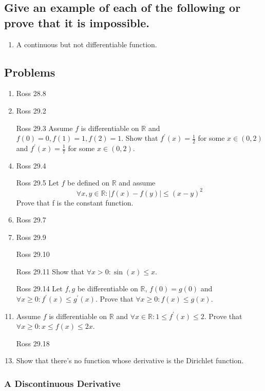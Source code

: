 \documentclass{article}
\theoremstyle{definition}
\newcommand{\R}{\mathbb{R}}
\newcommand{\fdiff}{f^{\prime}}
\begin{document}
\subsection{Give an example of each of the following or prove that it is impossible.}

\begin{enumerate}
    \item A continuous but not differentiable function.
\end{enumerate}

\subsection{Problems}

\begin{enumerate}
    \item Ross 28.8
    \item Ross 29.2
    \item[Ross 29.3] Assume $f$ is differentiable on $\R$ and $f(0) = 0, f(1) = 1, f(2) = 1$.
    Show that $\fdiff(x) = \frac{1}{2}$ for some $x \in (0,2)$ and 
    $\fdiff(x) = \frac{1}{7}$ for some $x \in (0,2)$.
    \item Ross 29.4 
    \item[Ross 29.5] Let $f$ be defined on $\R$ and assume 
    \[\forall x,y \in \R: \lvert f(x) - f(y) \rvert \leq (x - y)^{2} \]
    Prove that f is the constant function.
    \item Ross 29.7
    \item Ross 29.9
    \item[Ross 29.10] 
    \item[Ross 29.11] Show that $\forall x > 0: \sin(x) \leq x$.
    \item[Ross 29.14] Let $f,g$ be differentiable on $\R$, $f(0) = g(0)$ and 
    $\forall x \geq 0: \fdiff(x) \leq g^{\prime}(x)$. Prove that $\forall x \geq 0: f(x) \leq g(x)$.
    \item Assume $f$ is differentiable on $\R$ and $\forall x \in \R: 1 \leq f^{\prime}(x) \leq 2$.
    Prove that $\forall x \geq 0: x \leq f(x) \leq 2x$.
    \item[Ross 29.18] 
    \item Show that there's no function whose derivative is the Dirichlet function. 

\end{enumerate}

\subsubsection{A Discontinuous Derivative}
\end{document}

